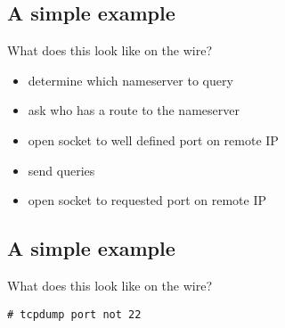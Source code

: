 \documentclass[xga]{xdvislides}
\begin{document}

\Normalsize

\subsection{A simple example}
What does this look like on the wire?
\\

\begin{itemize}
	\item determine which nameserver to query
	\item ask who has a route to the nameserver
	\item open socket to well defined port on remote IP
	\item send queries
	\item open socket to requested port on remote IP
\end{itemize}

\subsection{A simple example}
What does this look like on the wire?
\vspace*{1in}
\\
\Hugesize
\begin{center}
\begin{verbatim}
# tcpdump port not 22
\end{verbatim}
\end{center}
\Normalsize
\vspace*{\fill}
\end{document}
